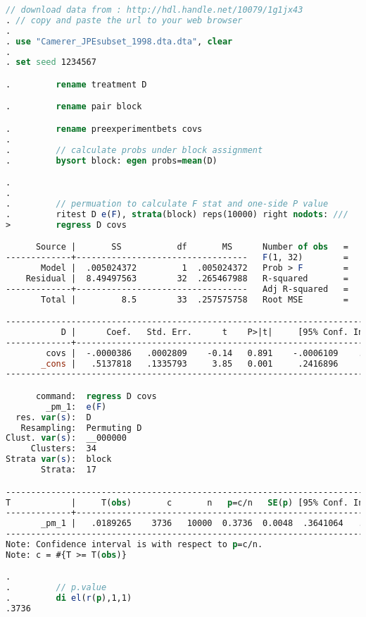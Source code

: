 \documentclass[a4paper]{article}
\begin{document}
\begin{lstlisting}[language=stata]
 // download data from : http://hdl.handle.net/10079/1g1jx43
. // copy and paste the url to your web browser
. 
. use "Camerer_JPEsubset_1998.dta.dta", clear 
. 
. set seed 1234567

.         rename treatment D

.         rename pair block

.         rename preexperimentbets covs
. 
.         // calculate probs under block assignment
.         bysort block: egen probs=mean(D)

.         
.                 
.         // permuation to calculate F stat and one-side P value
.         ritest D e(F), strata(block) reps(10000) right nodots: ///
>         regress D covs

      Source |       SS           df       MS      Number of obs   =        34
-------------+----------------------------------   F(1, 32)        =      0.02
       Model |  .005024372         1  .005024372   Prob > F        =    0.8914
    Residual |  8.49497563        32  .265467988   R-squared       =    0.0006
-------------+----------------------------------   Adj R-squared   =   -0.0306
       Total |         8.5        33  .257575758   Root MSE        =    .51524

------------------------------------------------------------------------------
           D |      Coef.   Std. Err.      t    P>|t|     [95% Conf. Interval]
-------------+----------------------------------------------------------------
        covs |  -.0000386   .0002809    -0.14   0.891    -.0006109    .0005336
       _cons |   .5137818   .1335793     3.85   0.001     .2416896     .785874
------------------------------------------------------------------------------

      command:  regress D covs
        _pm_1:  e(F)
  res. var(s):  D
   Resampling:  Permuting D
Clust. var(s):  __000000
     Clusters:  34
Strata var(s):  block
       Strata:  17

------------------------------------------------------------------------------
T            |     T(obs)       c       n   p=c/n   SE(p) [95% Conf. Interval]
-------------+----------------------------------------------------------------
       _pm_1 |   .0189265    3736   10000  0.3736  0.0048  .3641064   .3831672
------------------------------------------------------------------------------
Note: Confidence interval is with respect to p=c/n.
Note: c = #{T >= T(obs)}

. 
.         // p.value
.         di el(r(p),1,1)
.3736



\end{lstlisting}
\end{document}
